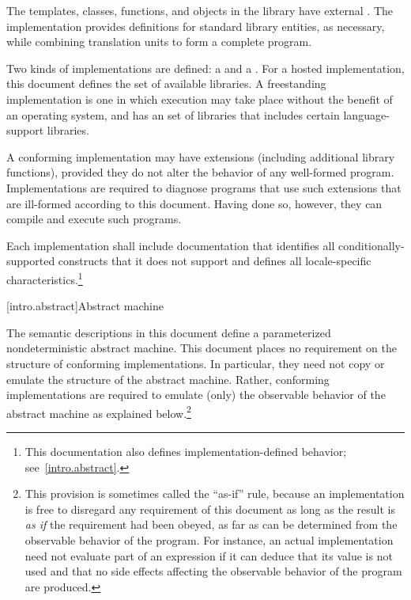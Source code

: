 \pnum
The templates, classes, functions, and objects in the library have
external . The implementation provides
definitions for standard library entities, as necessary, while combining
translation units to form a complete \Cpp{}  program.%

\pnum
Two kinds of implementations are defined: a  and a
. For a hosted implementation, this
document defines the set of available libraries. A freestanding
implementation is one in which execution may take place without the benefit of
an operating system, and has an  set of libraries that includes certain language-support
libraries.

\pnum
A conforming implementation may have extensions (including
additional library functions), provided they do not alter the
behavior of any well-formed program.
Implementations are required to diagnose programs that use such
extensions that are ill-formed according to this document.
Having done so, however, they can compile and execute such programs.

\pnum
Each implementation shall include documentation that identifies all
conditionally-supported constructs
that it does not support and defines all locale-specific characteristics.\footnote{This documentation also defines implementation-defined behavior;
see~\ref{intro.abstract}.}%
%
%

[intro.abstract]{Abstract machine}

\pnum
{}%
%
The semantic descriptions in this document define a
parameterized nondeterministic abstract machine. This document
places no requirement on the structure of conforming
implementations. In particular, they need not copy or emulate the
structure of the abstract machine.
%
%
Rather, conforming implementations are required to emulate (only) the observable
behavior of the abstract machine as explained below.\footnote{This provision is
sometimes called the ``as-if'' rule, because an implementation is free to
disregard any requirement of this document as long as the result
is \emph{as if} the requirement had been obeyed, as far as can be determined
from the observable behavior of the program. For instance, an actual
implementation need not evaluate part of an expression if it can deduce that its
value is not used and that no
%
side effects affecting the
observable behavior of the program are produced.}


